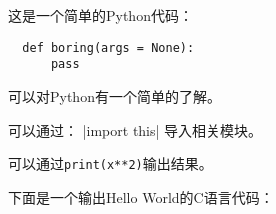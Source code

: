 \documentclass{ctexart}
\begin{document}
 
这是一个简单的Python代码：
\begin{verbatim}
  def boring(args = None):
      pass
\end{verbatim}
可以对Python有一个简单的了解。

可以通过：
|import this|
导入相关模块。

可以通过\texttt{print(x**2)}输出结果。

下面是一个输出Hello World的C语言代码：
\inputminted{c}{helloworld.c}
\end{document}
